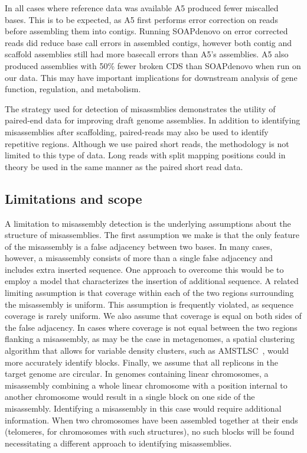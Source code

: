 \documentclass[10pt]{article}
\begin{document}
In all cases where reference data was available A5 produced fewer miscalled bases. This is to
be expected, as A5 first performs error correction on reads before assembling them into contigs.
Running SOAPdenovo on error corrected reads did reduce base call errors in assembled contigs, however both contig and scaffold assemblies still had more basecall errors than A5's assemblies.
A5 also produced assemblies
with 50\% fewer broken CDS than SOAPdenovo when run on our data. This may have important implications for downstream analysis of gene function, regulation, and metabolism.

The strategy used for detection of misassmblies demonstrates the utility of paired-end data for improving draft genome assemblies.
In addition to identifying misassemblies after scaffolding, paired-reads may also be used to identify repetitive regions.   
Although we use paired short reads, the methodology is not limited to this type of data. Long reads with split mapping positions 
could in theory be used in the same manner as the paired short read data.

\subsection*{Limitations and scope}

A limitation to misassembly detection is the underlying assumptions about the structure of misassemblies. The first assumption we make
is that the only feature of the misassembly is a false adjacency between two bases.
In many cases, however, a misassembly consists of more than a single false adjacency and includes extra inserted sequence.  One approach to
overcome this would be to employ a model that characterizes the insertion of additional sequence. A related limiting assumption is 
that coverage within each of the two regions surrounding the misassembly is uniform. This assumption is frequently violated, as sequence coverage
is rarely uniform. We also assume that coverage is equal on both sides of the false adjacency. In cases where coverage is not equal between 
the two regions flanking a misassembly, as may be the case in metagenomes, a spatial clustering algorithm that allows for variable density
clusters, such as AMSTLSC~\cite{AMSTLSC}, would more accurately identify blocks. Finally, we assume that all replicons in the target genome
are circular. In genomes containing linear chromosomes, a misassembly combining a whole linear chromosome with a position internal to another chromosome
 would result in a single block on one side of the misassembly. Identifying a misassembly in this case
would require additional information. When two chromosomes have been assembled together at their ends (telomeres, for chromosomes with such structures), no such blocks will be found 
necessitating a different approach to identifying misassemblies.
\end{document}
